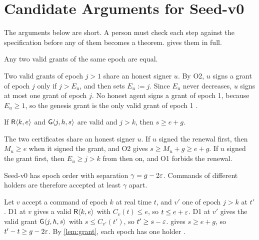 \section{Candidate Arguments for Seed-v0}
\label{sec:arguments}

The arguments below are short. A person must check each step against the specification
before any of them becomes a theorem.  gives them in full.

\begin{lem}
\label{lem:grant}
Any two valid grants of the same epoch are equal.
\end{lem}

\begin{argument}
Two valid grants of epoch $j > 1$ share an honest signer $u$. By O2, $u$ signs a grant of
epoch $j$ only if $j > E_u$, and then sets $E_u := j$. Since $E_u$ never decreases, $u$
signs at most one grant of epoch $j$. No honest agent signs a grant of epoch 1, because
$E_u \ge 1$, so the genesis grant is the only valid grant of epoch 1 .
\end{argument}

\begin{lem}
\label{lem:sep}
If $\mathsf{R}\langle k, e\rangle$ and $\mathsf{G}\langle j, h, s\rangle$ are valid and $j > k$, then $s \ge e + g$.
\end{lem}

\begin{argument}
The two certificates share an honest signer $u$. If $u$ signed the renewal first, then
$M_u \ge e$ when it signed the grant, and O2 gives $s \ge M_u + g \ge e + g$. If $u$ signed
the grant first, then $E_u \ge j > k$ from then on, and O1 forbids the renewal.
\end{argument}

\begin{prp}
\label{prp:order}
Seed-v0 has epoch order with separation $\gamma = g - 2\varepsilon$. Commands of different
holders are therefore accepted at least $\gamma$ apart.
\end{prp}

\begin{argument}
Let $v$ accept a command of epoch $k$ at real time $t$, and $v'$ one of epoch $j > k$ at
$t'$. D1 at $v$ gives a valid $\mathsf{R}\langle k, e\rangle$ with $C_v(t) \le e$, so $t \le e + \varepsilon$. D1
at $v'$ gives the valid grant $\mathsf{G}\langle j, h, s\rangle$ with $s \le C_{v'}(t')$, so
$t' \ge s - \varepsilon$.  gives $s \ge e + g$, so $t' - t \ge g - 2\varepsilon$. By
\cref{lem:grant}, each epoch has one holder .
\end{argument}

